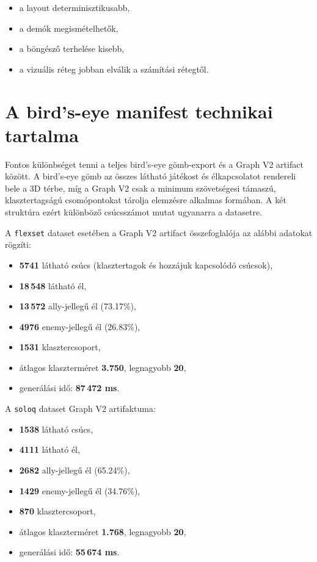 ﻿\documentclass[a4paper,12pt]{report}
\begin{document}
\begin{itemize}
    \item a layout determinisztikusabb,
    \item a demók megismételhetők,
    \item a böngésző terhelése kisebb,
    \item a vizuális réteg jobban elválik a számítási rétegtől.
\end{itemize}

\section{A bird's-eye manifest technikai tartalma}

Fontos különbséget tenni a teljes bird's-eye gömb-export és a Graph V2 artifact között. A bird's-eye gömb az összes látható játékost és élkapcsolatot rendereli bele a 3D térbe, míg a Graph V2 csak a minimum szövetségesi támaszú, klasztertagságú csomópontokat tárolja elemzésre alkalmas formában. A két struktúra ezért különböző csúcsszámot mutat ugyanarra a datasetre.

A \texttt{flexset} dataset esetében a Graph V2 artifact összefoglalója az alábbi adatokat rögzíti:

\begin{itemize}
    \item \textbf{5741} látható csúcs (klasztertagok és hozzájuk kapcsolódó csúcsok),
    \item \textbf{18\,548} látható él,
    \item \textbf{13\,572} ally-jellegű él (73.17\%),
    \item \textbf{4976} enemy-jellegű él (26.83\%),
    \item \textbf{1531} klasztercsoport,
    \item átlagos klaszterméret \textbf{3.750}, legnagyobb \textbf{20},
    \item generálási idő: \textbf{87\,472 ms}.
\end{itemize}

A \texttt{soloq} dataset Graph V2 artifaktuma:

\begin{itemize}
    \item \textbf{1538} látható csúcs,
    \item \textbf{4111} látható él,
    \item \textbf{2682} ally-jellegű él (65.24\%),
    \item \textbf{1429} enemy-jellegű él (34.76\%),
    \item \textbf{870} klasztercsoport,
    \item átlagos klaszterméret \textbf{1.768}, legnagyobb \textbf{20},
    \item generálási idő: \textbf{55\,674 ms}.
\end{itemize}
\end{document}

